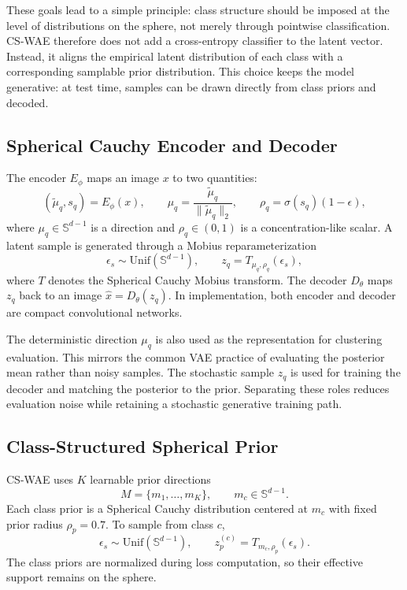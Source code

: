 \documentclass[10pt]{article}
\begin{document}
These goals lead to a simple principle: class structure should be imposed at the level of distributions on the sphere, not merely through pointwise classification. CS-WAE therefore does not add a cross-entropy classifier to the latent vector. Instead, it aligns the empirical latent distribution of each class with a corresponding samplable prior distribution. This choice keeps the model generative: at test time, samples can be drawn directly from class priors and decoded.

\subsection{Spherical Cauchy Encoder and Decoder}

The encoder $E_\phi$ maps an image $x$ to two quantities:
\begin{equation}
    (\tilde{\mu}_q, s_q) = E_\phi(x), \qquad
    \mu_q = \frac{\tilde{\mu}_q}{\|\tilde{\mu}_q\|_2}, \qquad
    \rho_q = \sigma(s_q)(1-\epsilon),
\end{equation}
where $\mu_q\in\mathbb{S}^{d-1}$ is a direction and $\rho_q\in(0,1)$ is a concentration-like scalar. A latent sample is generated through a Mobius reparameterization
\begin{equation}
    \epsilon_s \sim \mathrm{Unif}(\mathbb{S}^{d-1}), \qquad
    z_q = T_{\mu_q,\rho_q}(\epsilon_s),
\end{equation}
where $T$ denotes the Spherical Cauchy Mobius transform. The decoder $D_\theta$ maps $z_q$ back to an image $\hat{x}=D_\theta(z_q)$. In implementation, both encoder and decoder are compact convolutional networks.

The deterministic direction $\mu_q$ is also used as the representation for clustering evaluation. This mirrors the common VAE practice of evaluating the posterior mean rather than noisy samples. The stochastic sample $z_q$ is used for training the decoder and matching the posterior to the prior. Separating these roles reduces evaluation noise while retaining a stochastic generative training path.

\subsection{Class-Structured Spherical Prior}

CS-WAE uses $K$ learnable prior directions
\begin{equation}
    M = \{m_1,\dots,m_K\}, \qquad m_c \in \mathbb{S}^{d-1}.
\end{equation}
Each class prior is a Spherical Cauchy distribution centered at $m_c$ with fixed prior radius $\rho_p=0.7$. To sample from class $c$,
\begin{equation}
    \epsilon_s \sim \mathrm{Unif}(\mathbb{S}^{d-1}), \qquad
    z_p^{(c)} = T_{m_c,\rho_p}(\epsilon_s).
\end{equation}
The class priors are normalized during loss computation, so their effective support remains on the sphere.
\end{document}
